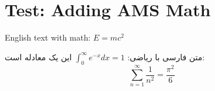 \documentclass[12pt,a4paper]{article}
\begin{document}
\section*{Test: Adding AMS Math}

English text with math: $E = mc^2$

\textfarsi{متن فارسی با ریاضی:} $\int_0^\infty e^{-x} dx = 1$
\textfarsi{این یک معادله است:}
\begin{equation}
\sum_{n=1}^{\infty} \frac{1}{n^2} = \frac{\pi^2}{6}
\end{equation}
\end{document}
